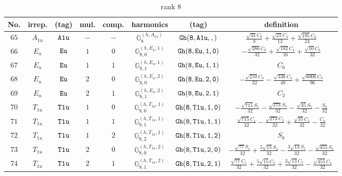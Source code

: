 \documentclass[fleqn,8pt]{jsarticle}
\begin{document}
\begin{table}[ht!]
\begin{center}
\caption{rank 8}
\renewcommand{\arraystretch}{1.3}
\begin{tabular}{cccccccc} \hline \hline
No. & irrep. & (tag) & mul. & comp. & harmonics & (tag) & definition \\ \hline
$ 65 $ & $ A_{1u} $ & $ {\tt A1u} $ & $ - $ & $ - $ & $ \mathbb{G}_{8}^{(h,A_{1u})} $ & $ {\tt Gh(8,A1u,,)} $ & $ \frac{\sqrt{33} C_{0}}{8} + \frac{\sqrt{21} C_{4}}{12} + \frac{\sqrt{195} C_{8}}{24} $ \\
$ 66 $ & $ E_{u} $ & $ {\tt Eu} $ & $ 1 $ & $ 0 $ & $ \mathbb{G}_{8,0}^{(h,E_{u},1)} $ & $ {\tt Gh(8,Eu,1,0)} $ & $ - \frac{\sqrt{286} C_{0}}{32} + \frac{\sqrt{182} C_{4}}{16} + \frac{\sqrt{10} C_{8}}{32} $ \\
$ 67 $ & $ E_{u} $ & $ {\tt Eu} $ & $ 1 $ & $ 1 $ & $ \mathbb{G}_{8,1}^{(h,E_{u},1)} $ & $ {\tt Gh(8,Eu,1,1)} $ & $ C_{6} $ \\
$ 68 $ & $ E_{u} $ & $ {\tt Eu} $ & $ 2 $ & $ 0 $ & $ \mathbb{G}_{8,0}^{(h,E_{u},2)} $ & $ {\tt Gh(8,Eu,2,0)} $ & $ - \frac{\sqrt{210} C_{0}}{32} - \frac{\sqrt{330} C_{4}}{48} + \frac{\sqrt{6006} C_{8}}{96} $ \\
$ 69 $ & $ E_{u} $ & $ {\tt Eu} $ & $ 2 $ & $ 1 $ & $ \mathbb{G}_{8,1}^{(h,E_{u},2)} $ & $ {\tt Gh(8,Eu,2,1)} $ & $ C_{2} $ \\
$ 70 $ & $ T_{1u} $ & $ {\tt T1u} $ & $ 1 $ & $ 0 $ & $ \mathbb{G}_{8,0}^{(h,T_{1u},1)} $ & $ {\tt Gh(8,T1u,1,0)} $ & $ - \frac{\sqrt{715} S_{1}}{32} - \frac{\sqrt{273} S_{3}}{32} - \frac{\sqrt{35} S_{5}}{32} - \frac{S_{7}}{32} $ \\
$ 71 $ & $ T_{1u} $ & $ {\tt T1u} $ & $ 1 $ & $ 1 $ & $ \mathbb{G}_{8,1}^{(h,T_{1u},1)} $ & $ {\tt Gh(8,T1u,1,1)} $ & $ \frac{\sqrt{715} C_{1}}{32} - \frac{\sqrt{273} C_{3}}{32} + \frac{\sqrt{35} C_{5}}{32} - \frac{C_{7}}{32} $ \\
$ 72 $ & $ T_{1u} $ & $ {\tt T1u} $ & $ 1 $ & $ 2 $ & $ \mathbb{G}_{8,2}^{(h,T_{1u},1)} $ & $ {\tt Gh(8,T1u,1,2)} $ & $ S_{8} $ \\
$ 73 $ & $ T_{1u} $ & $ {\tt T1u} $ & $ 2 $ & $ 0 $ & $ \mathbb{G}_{8,0}^{(h,T_{1u},2)} $ & $ {\tt Gh(8,T1u,2,0)} $ & $ - \frac{\sqrt{77} S_{1}}{32} + \frac{5 \sqrt{15} S_{3}}{32} - \frac{3 \sqrt{13} S_{5}}{32} - \frac{\sqrt{455} S_{7}}{32} $ \\
$ 74 $ & $ T_{1u} $ & $ {\tt T1u} $ & $ 2 $ & $ 1 $ & $ \mathbb{G}_{8,1}^{(h,T_{1u},2)} $ & $ {\tt Gh(8,T1u,2,1)} $ & $ \frac{\sqrt{77} C_{1}}{32} + \frac{5 \sqrt{15} C_{3}}{32} + \frac{3 \sqrt{13} C_{5}}{32} - \frac{\sqrt{455} C_{7}}{32} $ \\

\end{tabular}
\end{center}
\end{table}
\end{document}
